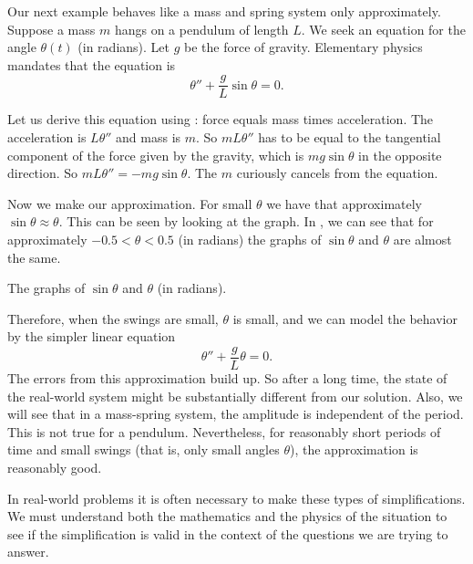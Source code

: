 \medskip

\begin{mywrapfigsimp}[10]{1.8in}{2.16in}
\noindent
{}
\end{mywrapfigsimp}
Our next example behaves like a mass and spring system only
approximately. Suppose a
mass $m$ hangs on a pendulum of length $L$.  We seek an equation for
the angle $\theta(t)$ (in radians).  Let $g$ be the force of gravity.
Elementary physics mandates that the equation is
\begin{equation*}
\theta'' + \frac{g}{L} \sin \theta = 0 .
\end{equation*}

Let us derive this equation using :
force equals mass times acceleration.  The acceleration is
$L \theta''$ and mass is $m$.  So $mL\theta''$ has to be equal
to the tangential component of the force given by the gravity, which is
$m g \sin \theta$ in the opposite direction.
So $mL\theta'' = -mg \sin \theta$.
The $m$ curiously cancels from the equation.

Now we make our approximation.  For small $\theta$ we have that approximately
$\sin \theta \approx \theta$.  This can be seen by looking at the graph.
In , we can see that for approximately
$-0.5 < \theta < 0.5$ (in radians) the graphs of $\sin \theta$ and $\theta$ are almost the
same.

\begin{mywrapfig}{3.25in}
\capstart
{}
\caption{The graphs of $\sin \theta$ and $\theta$ (in radians).\label{mv:sinthetafig}}
\end{mywrapfig}

Therefore, when the swings are small, $\theta$ is small, and we can
model the behavior by the simpler linear equation
\begin{equation*}
\theta'' + \frac{g}{L} \theta = 0 .
\end{equation*}
The errors from this approximation build up.
So after a
long time, the state of the real-world system might be substantially
different from our solution.  Also, we will
see that in a mass-spring system, the amplitude is independent of the
period.
This is not true for a pendulum.  Nevertheless, for reasonably short periods of time
and small swings (that is, only small angles $\theta$),
the approximation is reasonably good.

In real-world problems it is often necessary to make these types of
simplifications.  We must understand both the mathematics and
the physics of the situation to see if the simplification is valid in the
context of the questions we are trying to answer.


